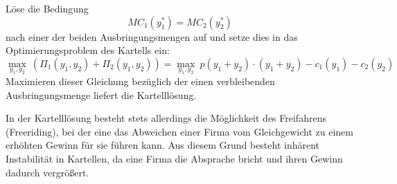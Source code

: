 \begin{kr}[Kartell]
	Löse die Bedingung
		$$ MC_1(y_1^*) = MC_2(y_2^*) $$	
	nach einer der beiden Ausbringungsmengen auf und setze dies in das Optimierungsproblem des Kartells ein:
		$$ \max_{y_1, y_2} ~ \left( \Pi_1(y_1, y_2) + \Pi_2(y_1, y_2) \right) = \max_{y_1, y_2} ~ p \left( y_1 + y_2 \right) \cdot \left( y_1 + y_2 \right) - c_1(y_1) - c_2(y_2) $$
	Maximieren dieser Gleichung bezüglich der einen verbleibenden Ausbringungsmenge liefert die Kartelllösung.
\end{kr}

In der Kartelllösung besteht stets allerdings die Möglichkeit des Freifahrens (Freeriding), bei der eine das Abweichen einer Firma vom Gleichgewicht zu einem erhöhten Gewinn für sie führen kann. Aus diesem Grund besteht inhärent Instabilität in Kartellen, da eine Firma die Absprache bricht und ihren Gewinn dadurch vergrößert. ~\bigskip
	
